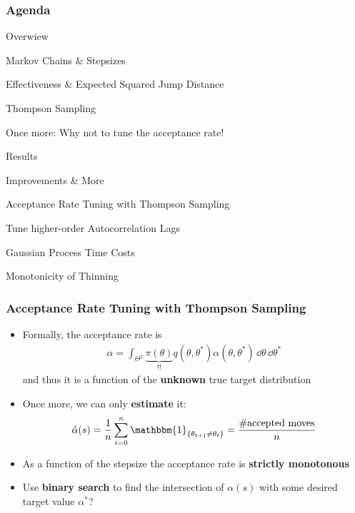 \begin{frame}[c]
    \frametitle{Agenda}
    \begin{itemize}
        {\color{lgray}
        \item Overwiew
        }
        \begin{itemize}
            {\color{lgray}
            \item Markov Chains \& Stepsizes
            \item Effectiveness \& Expected Squared Jump Distance 
            \item Thompson Sampling
            \item Once more: Why not to tune the acceptance rate!
            }
        \end{itemize}
        {\color{lgray}
        \item Results
        }
        \item Improvements \& More
        \begin{itemize}
            \item Acceptance Rate Tuning with Thompson Sampling
            {\color{lgray}
            \item Tune higher-order Autocorrelation Lags
            \item Gaussian Process Time Costs
            \item Monotonicity of Thinning
        }
        \end{itemize}
    \end{itemize}
\end{frame}

\begin{frame}[c]
    \frametitle{Acceptance Rate Tuning with Thompson Sampling}
    \begin{itemize}
        \item Formally, the acceptance rate is
            \begin{align*}
                \alpha = \int_{\Theta^2} \underbrace{\pi(\theta)}_{!!} q(\theta, \theta^*) \alpha(\theta, \theta^*) \, \dd \theta \, \dd \theta^*
            \end{align*}
            and thus it is a function of the \textbf{unknown} true target distribution
        \item Once more, we can only \textbf{estimate} it:
            \begin{align*}
                \hat{\alpha}(s) = \frac{1}{n}\sum_{i=0}^n \mathbbm{1}_{\{\theta_{t+1} \neq \theta_t\}} = \frac{\text{\#accepted moves}}{n}
            \end{align*}
        \item As a function of the stepsize the acceptance rate is \textbf{strictly monotonous}
        \item Use \textbf{binary search} to find the intersection of $\alpha(s)$ with some desired target value $\alpha^*$?
    \end{itemize}
\end{frame}

